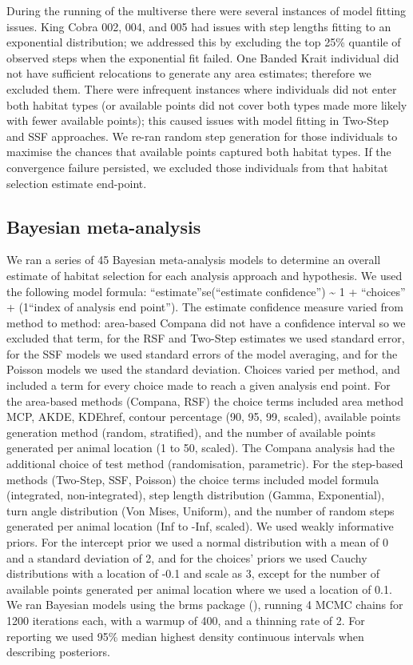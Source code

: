 \documentclass[10pt,a4paper]{article}
\begin{document}
During the running of the multiverse there were several instances of model fitting issues.
King Cobra 002, 004, and 005 had issues with step lengths fitting to an exponential distribution; we addressed this by excluding the top 25\% quantile of observed steps when the exponential fit failed.
One Banded Krait individual did not have sufficient relocations to generate any area estimates; therefore we excluded them.
There were infrequent instances where individuals did not enter both habitat types (or available points did not cover both types made more likely with fewer available points); this caused issues with model fitting in Two-Step and SSF approaches.
We re-ran random step generation for those individuals to maximise the chances that available points captured both habitat types.
If the convergence failure persisted, we excluded those individuals from that habitat selection estimate end-point.

\subsection{Bayesian meta-analysis}\label{bayesian-meta-analysis}

We ran a series of 45 Bayesian meta-analysis models to determine an overall estimate of habitat selection for each analysis approach and hypothesis.
We used the following model formula: ``estimate''\textbar se(``estimate confidence'') \textasciitilde{} 1 + ``choices'' + (1\textbar{}``index of analysis end point'').
The estimate confidence measure varied from method to method: area-based Compana did not have a confidence interval so we excluded that term, for the RSF and Two-Step estimates we used standard error, for the SSF models we used standard errors of the model averaging, and for the Poisson models we used the standard deviation.
Choices varied per method, and included a term for every choice made to reach a given analysis end point.
For the area-based methods (Compana, RSF) the choice terms included area method MCP, AKDE, KDEhref, contour percentage (90, 95, 99, scaled), available points generation method (random, stratified), and the number of available points generated per animal location (1 to 50, scaled).
The Compana analysis had the additional choice of test method (randomisation, parametric).
For the step-based methods (Two-Step, SSF, Poisson) the choice terms included model formula (integrated, non-integrated), step length distribution (Gamma, Exponential), turn angle distribution (Von Mises, Uniform), and the number of random steps generated per animal location (Inf to -Inf, scaled).
We used weakly informative priors.
For the intercept prior we used a normal distribution with a mean of 0 and a standard deviation of 2, and for the choices' priors we used Cauchy distributions with a location of -0.1 and scale as 3, except for the number of available points generated per animal location where we used a location of 0.1.
We ran Bayesian models using the brms package (), running 4 MCMC chains for 1200 iterations each, with a warmup of 400, and a thinning rate of 2.
For reporting we used 95\% median highest density continuous intervals when describing posteriors.
\end{document}
